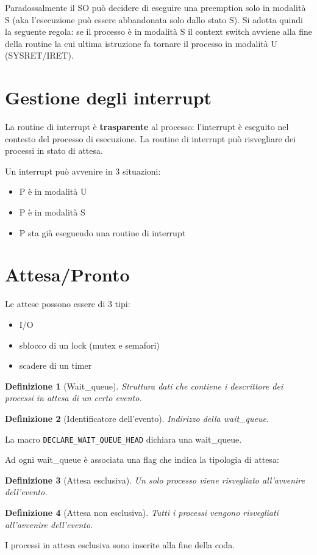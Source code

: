 \documentclass[12pt, a4paper]{report}
\newtheorem{definition}{Definizione}
\begin{document}
Paradossalmente il SO può decidere di eseguire una preemption solo in modalità S
(aka l'esecuzione può essere abbandonata solo dallo stato S). Si adotta quindi
la seguente regola: se il processo è in modalità S il context switch avviene
alla fine della routine la cui ultima istruzione fa tornare il processo in
modalità U (SYSRET/IRET).


\section{Gestione degli interrupt}
La routine di interrupt è \textbf{trasparente} al processo: l'interrupt è
eseguito nel contesto del processo di esecuzione.
La routine di interrupt può risvegliare dei processi in stato di attesa.

Un interrupt può avvenire in 3 situazioni:
\begin{itemize}
	\item P è in modalità U
	\item P è in modalità S
	\item P sta già eseguendo una routine di interrupt
\end{itemize}
\section{Attesa/Pronto}
Le attese possono essere di 3 tipi:
\begin{itemize}
	\item I/O
	\item sblocco di un lock (mutex e semafori)
	\item scadere di un timer
\end{itemize}

\begin{definition}[Wait\_queue]
	Struttura dati che contiene i descrittore dei processi in attesa di un certo
	evento.
\end{definition}
\begin{definition}[Identificatore dell'evento]
	Indirizzo della wait\_queue.
\end{definition}
La macro \texttt{DECLARE\_WAIT\_QUEUE\_HEAD} dichiara una wait\_queue.

Ad ogni wait\_queue è associata una flag che indica la tipologia di attesa:
\begin{definition}[Attesa esclusiva]
	Un solo processo viene risvegliato all'avvenire dell'evento.
\end{definition}
\begin{definition}[Attesa non esclusiva]
	Tutti i processi vengono risvegliati all'avvenire dell'evento.
\end{definition}
I processi in attesa esclusiva sono inserite alla fine della coda.
\end{document}
